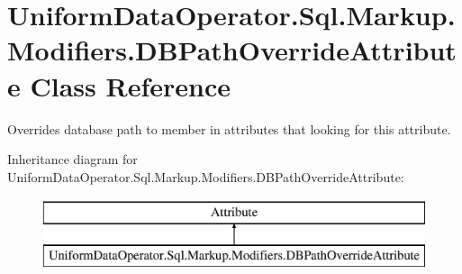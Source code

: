 \hypertarget{class_uniform_data_operator_1_1_sql_1_1_markup_1_1_modifiers_1_1_d_b_path_override_attribute}{}\section{Uniform\+Data\+Operator.\+Sql.\+Markup.\+Modifiers.\+D\+B\+Path\+Override\+Attribute Class Reference}
\label{class_uniform_data_operator_1_1_sql_1_1_markup_1_1_modifiers_1_1_d_b_path_override_attribute}


Overrides database path to member in attributes that looking for this attribute.  


Inheritance diagram for Uniform\+Data\+Operator.\+Sql.\+Markup.\+Modifiers.\+D\+B\+Path\+Override\+Attribute\+:\begin{figure}[H]
\begin{center}
\leavevmode
\includegraphics[height=2.000000cm]{d0/d9c/class_uniform_data_operator_1_1_sql_1_1_markup_1_1_modifiers_1_1_d_b_path_override_attribute}
\end{center}
\end{figure}
